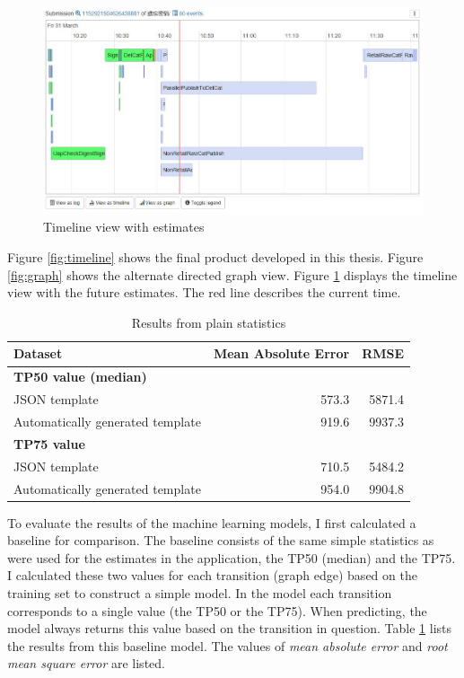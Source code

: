 \begin{figure}[htb]
\centering \includegraphics[width=\linewidth]{gfx/estimates.jpg}
\caption{Timeline view with estimates \label{fig:estimates}}
\end{figure}

Figure \ref{fig:timeline} shows the final product developed in this thesis.
Figure \ref{fig:graph} shows the alternate directed graph view.
Figure \ref{fig:estimates} displays the timeline view with the future estimates. The red line describes the current time.

\begin{table}[htb]
\begin{center}
\begin{tabularx}{\linewidth}{| X | r | r |}
\hline
Dataset & Mean Absolute Error & RMSE \\
\hline
\textbf{TP50 value (median)} &  & \\
JSON template                       & 573.3 & 5871.4 \\
Automatically generated template    & 919.6 & 9937.3 \\
\hline
\textbf{TP75 value} &  & \\
JSON template                       & 710.5 & 5484.2 \\
Automatically generated template    & 954.0 & 9904.8 \\
\hline
\end{tabularx}
\end{center}
\caption{Results from plain statistics}
\label{tab:statresults}
\end{table}

To evaluate the results of the machine learning models, I first calculated a baseline for comparison.
The baseline consists of the same simple statistics as were used for the estimates in the application, the TP50 (median) and the TP75.
I calculated these two values for each transition (graph edge) based on the training set to construct a simple model. 
In the model each transition corresponds to a single value (the TP50 or the TP75). 
When predicting, the model always returns this value based on the transition in question.
Table \ref{tab:statresults} lists the results from this baseline model. 
The values of \textit{mean absolute error} and \textit{root mean square error} are listed.

